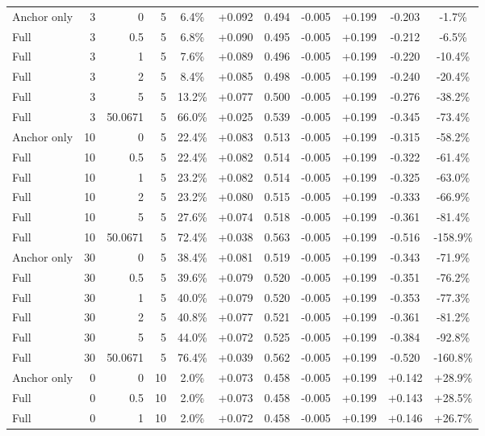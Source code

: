 \begin{table}[htbp]
\begin{tabular}{lrrrccccccc}
Anchor only & 3 & 0 & 5 & 6.4\% & +0.092 & 0.494 & -0.005 & +0.199 & -0.203 & -1.7\% \\
Full & 3 & 0.5 & 5 & 6.8\% & +0.090 & 0.495 & -0.005 & +0.199 & -0.212 & -6.5\% \\
Full & 3 & 1 & 5 & 7.6\% & +0.089 & 0.496 & -0.005 & +0.199 & -0.220 & -10.4\% \\
Full & 3 & 2 & 5 & 8.4\% & +0.085 & 0.498 & -0.005 & +0.199 & -0.240 & -20.4\% \\
Full & 3 & 5 & 5 & 13.2\% & +0.077 & 0.500 & -0.005 & +0.199 & -0.276 & -38.2\% \\
Full & 3 & 50.0671 & 5 & 66.0\% & +0.025 & 0.539 & -0.005 & +0.199 & -0.345 & -73.4\% \\
Anchor only & 10 & 0 & 5 & 22.4\% & +0.083 & 0.513 & -0.005 & +0.199 & -0.315 & -58.2\% \\
Full & 10 & 0.5 & 5 & 22.4\% & +0.082 & 0.514 & -0.005 & +0.199 & -0.322 & -61.4\% \\
Full & 10 & 1 & 5 & 23.2\% & +0.082 & 0.514 & -0.005 & +0.199 & -0.325 & -63.0\% \\
Full & 10 & 2 & 5 & 23.2\% & +0.080 & 0.515 & -0.005 & +0.199 & -0.333 & -66.9\% \\
Full & 10 & 5 & 5 & 27.6\% & +0.074 & 0.518 & -0.005 & +0.199 & -0.361 & -81.4\% \\
Full & 10 & 50.0671 & 5 & 72.4\% & +0.038 & 0.563 & -0.005 & +0.199 & -0.516 & -158.9\% \\
Anchor only & 30 & 0 & 5 & 38.4\% & +0.081 & 0.519 & -0.005 & +0.199 & -0.343 & -71.9\% \\
Full & 30 & 0.5 & 5 & 39.6\% & +0.079 & 0.520 & -0.005 & +0.199 & -0.351 & -76.2\% \\
Full & 30 & 1 & 5 & 40.0\% & +0.079 & 0.520 & -0.005 & +0.199 & -0.353 & -77.3\% \\
Full & 30 & 2 & 5 & 40.8\% & +0.077 & 0.521 & -0.005 & +0.199 & -0.361 & -81.2\% \\
Full & 30 & 5 & 5 & 44.0\% & +0.072 & 0.525 & -0.005 & +0.199 & -0.384 & -92.8\% \\
Full & 30 & 50.0671 & 5 & 76.4\% & +0.039 & 0.562 & -0.005 & +0.199 & -0.520 & -160.8\% \\
Anchor only & 0 & 0 & 10 & 2.0\% & +0.073 & 0.458 & -0.005 & +0.199 & +0.142 & +28.9\% \\
Full & 0 & 0.5 & 10 & 2.0\% & +0.073 & 0.458 & -0.005 & +0.199 & +0.143 & +28.5\% \\
Full & 0 & 1 & 10 & 2.0\% & +0.072 & 0.458 & -0.005 & +0.199 & +0.146 & +26.7\% \\

\end{tabular}
\end{table}
